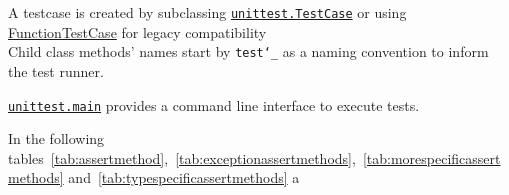 A testcase is created by subclassing 
\href{https://docs.python.org/3/library/unittest.html#unittest.TestCase}{\texttt{unittest.TestCase}} 
or using \href{https://docs.python.org/3/library/unittest.html#unittest.FunctionTestCase}{FunctionTestCase} for legacy compatibility\\
Child class methods' names start by \texttt{test\char`_} as a naming convention 
to inform the test runner. 

\href{https://docs.python.org/3/library/unittest.html#unittest.main}{\texttt{unittest.main}} 
provides a command line interface to execute tests.

In the following tables~\ref{tab:assertmethod},~\ref{tab:exceptionassertmethods},~\ref{tab:morespecificassertmethods} 
and~\ref{tab:typespecificassertmethods} a 

